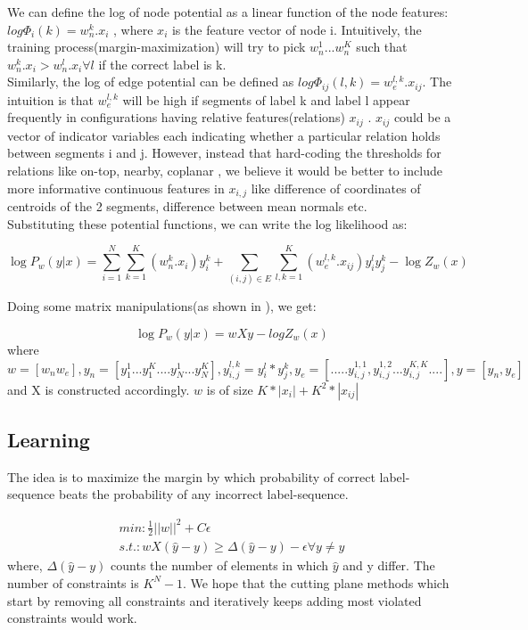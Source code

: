 \documentclass[11pt,a4paper,oneside]{report}
\begin{document}
  We can define the log of node potential as a linear function of the node features:  $log \Phi_i(k) = w_n^k.x_i$ , 
where $x_i$ is the feature vector of node i. Intuitively, the training process(margin-maximization) will try to pick $w_n^1...w_n^K$ such that $w_n^k.x_i>w_n^l.x_i \forall l$ if the correct label is k.\\
  Similarly, the log of edge potential can be defined as $log \Phi_{ij}(l,k) = w_{e}^{l,k}.x_{ij}$. The intuition is that $w_{e}^{l,k}$ will be high if segments of label k and label l appear frequently in configurations having relative features(relations) $x_{ij}$ . $x_{ij}$ could be a vector of indicator variables each indicating whether a particular relation holds between segments i and j.
However, instead that hard-coding the thresholds for relations like on-top, nearby, coplanar , we believe it would be better to include more informative continuous features in $x_{i,j}$ like difference of coordinates of centroids of the 2 segments, difference between mean normals etc.\\

Substituting these potential functions, we can write the log likelihood as: 

\begin{equation}
 \log P_w (y|x) = \sum_{i=1}^{N} \sum_{k=1}^{K} (w^{k}_{n}.x_{i})y_{i}^{k} + \sum_{(i,j)\in E} \sum_{l,k=1}^{K} (w_{e}^{l,k}.x_{ij})y_i^l y_j^k   -   \log Z_w(x)
\end{equation}

Doing some matrix manipulations(as shown in \cite{taskar2004learning}), we get:

\begin{equation}
 \log P_w (y|x) = wXy -logZ_w(x)
\end{equation}
where $w=[w_n w_e], y_n=[y_1^1...y_1^K....y_N^1...y_N^K],y_{i,j}^{l,k}=y_i^l*y_j^k,y_e=[ .....y_{i,j}^{1,1},y_{i,j}^{1,2}...y_{i,j}^{K,K} ....], y=[y_n,y_e]$ and X is constructed accordingly.
$w$ is of size $K*|x_i|+K^2*|x_{ij}|$

\subsection{Learning}
The idea is to maximize the margin by which probability of correct label-sequence beats the probability of any incorrect label-sequence.

\begin{eqnarray*}
min: \frac{1}{2} ||w||^2 + C\epsilon\\
s.t.: wX(\hat{y}-y)\ge \Delta(\hat{y}-y) -\epsilon \forall y\neq \hat{y}
\end{eqnarray*}
where, $\Delta(\hat{y}-y)$ counts the number of elements in which $\hat{y}$ and y differ.
The number of constraints is $K^N-1$. We hope that the cutting plane methods\cite{joachims2009cutting} 
which start by removing all constraints and  iteratively keeps adding most violated constraints would work.
\end{document}
